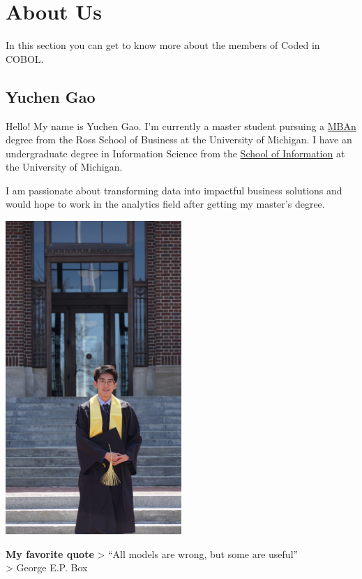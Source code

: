 \documentclass[
]{book}
\theoremstyle{definition}
\theoremstyle{definition}
\theoremstyle{definition}
\theoremstyle{definition}
\theoremstyle{remark}
\begin{document}
\hypertarget{about-us}{%
\chapter{About Us}\label{about-us}}

In this section you can get to know more about the members of Coded in COBOL.

\hypertarget{yuchen-gao}{%
\section{Yuchen Gao}\label{yuchen-gao}}

Hello! My name is Yuchen Gao. I'm currently a master student pursuing a \href{https://michiganross.umich.edu/graduate/master-of-business-analytics}{MBAn} degree from the Ross School of Business at the University of Michigan. I have an undergraduate degree in Information Science from the \href{https://www.si.umich.edu/}{School of Information} at the University of Michigan.

I am passionate about transforming data into impactful business solutions and would hope to work in the analytics field after getting my master's degree.

\includegraphics[width=0.5\textwidth,height=\textheight]{DSC00610.jpg}

\textbf{My favorite quote}
\textgreater{} ``All models are wrong, but some are useful''\\
\textgreater{} George E.P. Box
\end{document}
